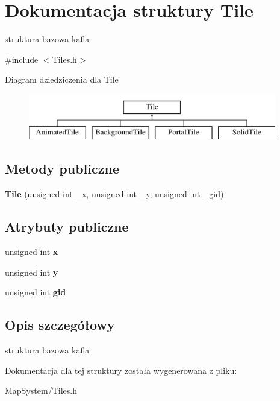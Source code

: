 \hypertarget{struct_tile}{\section{Dokumentacja struktury Tile}
\label{struct_tile}
}


struktura bazowa kafla  




{\ttfamily \#include $<$Tiles.\-h$>$}

Diagram dziedziczenia dla Tile\begin{figure}[H]
\begin{center}
\leavevmode
\includegraphics[height=2.000000cm]{struct_tile}
\end{center}
\end{figure}
\subsection*{Metody publiczne}
\begin{DoxyCompactItemize}
\item 
\hypertarget{struct_tile_a60143acae451458a180267fdabfd80c7}{{\bfseries Tile} (unsigned int \-\_\-x, unsigned int \-\_\-y, unsigned int \-\_\-gid)}\label{struct_tile_a60143acae451458a180267fdabfd80c7}

\end{DoxyCompactItemize}
\subsection*{Atrybuty publiczne}
\begin{DoxyCompactItemize}
\item 
\hypertarget{struct_tile_ad8ba78a01a259b052e267c754f525413}{unsigned int {\bfseries x}}\label{struct_tile_ad8ba78a01a259b052e267c754f525413}

\item 
\hypertarget{struct_tile_a33e9c4b212bbdec7eeac2f55b5b98223}{unsigned int {\bfseries y}}\label{struct_tile_a33e9c4b212bbdec7eeac2f55b5b98223}

\item 
\hypertarget{struct_tile_ac72ddfe3b77d6332c089276a0a696490}{unsigned int {\bfseries gid}}\label{struct_tile_ac72ddfe3b77d6332c089276a0a696490}

\end{DoxyCompactItemize}


\subsection{Opis szczegółowy}
struktura bazowa kafla 

Dokumentacja dla tej struktury została wygenerowana z pliku\-:\begin{DoxyCompactItemize}
\item 
Map\-System/Tiles.\-h\end{DoxyCompactItemize}
